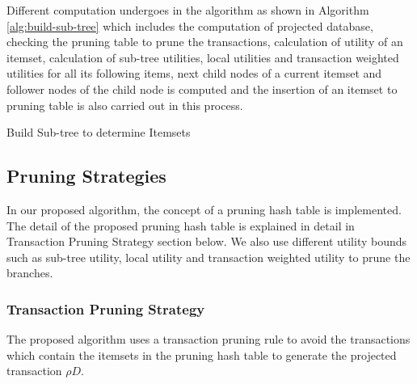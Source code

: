 \documentclass[11pt,openright]{report}
\begin{document}
Different computation undergoes in the algorithm as shown in Algorithm \ref{alg:build-sub-tree} which includes the computation of projected database, checking the pruning table to prune the transactions, calculation of utility of an itemset, calculation of sub-tree utilities, local utilities and transaction weighted utilities for all its following items, next child nodes of a current itemset and follower nodes of the child node is computed and the insertion of an itemset to pruning table is also carried out in this process.

 {\SetAlgoNoLine
 	\begin{algorithm}[h]
 		\caption{Build Sub-tree to determine Itemsets}
 		\label{alg:build-sub-tree}
 	\end{algorithm}
 }

\subsection{Pruning Strategies}
In our proposed algorithm, the concept of a pruning hash table is implemented. The detail of the proposed pruning hash table is explained in detail in Transaction Pruning Strategy section below. We also use different utility bounds such as sub-tree utility, local utility and transaction weighted utility to prune the branches.


\subsubsection{Transaction Pruning Strategy}
The proposed algorithm uses a transaction pruning rule to avoid the transactions which contain the itemsets in the pruning hash table to generate the projected transaction ${\rho}D$.
\end{document}
